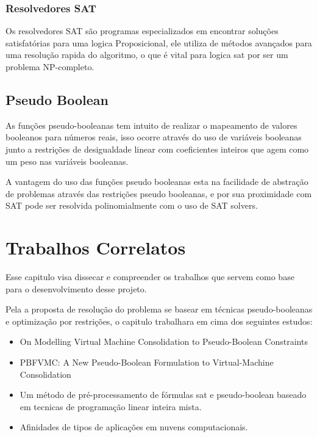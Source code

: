 \subsection{Resolvedores SAT}

Os resolvedores SAT são programas especializados em encontrar soluções satisfatórias para uma logica Proposicional, ele utiliza de métodos avançados para uma resolução rapida do algoritmo, o que é vital para logica sat por ser um problema NP-completo.

\section{Pseudo Boolean}

As funções pseudo-booleanas tem intuito de realizar o mapeamento de valores booleanos para números reais, isso ocorre através do uso de variáveis booleanas junto a restrições de desigualdade linear com coeficientes inteiros que agem como um peso nas variáveis booleanas.
	
A vantagem do uso das funções pseudo booleanas esta na facilidade de abstração de problemas através das restrições pseudo booleanas, e por sua proximidade com SAT pode ser resolvida polinomialmente com o uso de SAT solvers.  

\chapter[Trabalhos Correlatos]{Trabalhos Correlatos}

Esse capitulo visa dissecar e compreender os trabalhos que servem como base para o desenvolvimento desse projeto.

Pela a proposta de resolução do problema se basear em técnicas pseudo-booleanas e optimização por restrições, o capitulo trabalhara em cima dos seguintes estudos:

\begin{itemize}
    \item On Modelling Virtual Machine Consolidation to
    Pseudo-Boolean Constraints \cite{bruno2012}
    \item PBFVMC: A New Pseudo-Boolean Formulation to Virtual-Machine Consolidation \cite{bruno2013}
    \item Um método de pré-processamento de fórmulas sat e pseudo-boolean baseado em tecnicas de programação linear inteira mista. \cite{bruno2015}
    \item Afinidades de tipos de aplicações em nuvens computacionais.\cite{fabio2014}
\end{itemize}

